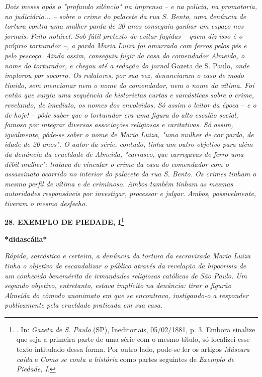\emph{Dois meses após o "profundo silêncio" na imprensa -- e na polícia,
na promotoria, no judiciário... -- sobre o crime do palacete da rua S.
Bento, uma denúncia de tortura contra uma mulher parda de 20 anos
conseguiu ganhar um espaço nos jornais. Feito notável. Sob fútil
pretexto de evitar fugidas -- quem diz isso é o próprio torturador --, a
parda Maria Luiza foi amarrada com ferros pelos pés e pelo pescoço.
Ainda assim, conseguiu fugir da casa do comendador Almeida, o nome do
torturador, e chegou até a redação do jornal} Gazeta de S. Paulo\emph{,
onde implorou por socorro. Os redatores, por sua vez, denunciaram o caso
de modo tímido, sem mencionar nem o nome do comendador, nem o nome da
vítima. Foi então que surgiu uma sequência de historietas curtas e
sarcásticas sobre o crime, revelando, de imediato, os nomes dos
envolvidos. Só assim o leitor da época -- e o de hoje! -- pôde saber que
o torturador era uma figura do alto escalão social, famoso por integrar
diversas associações religiosas e caritativas. Só assim, igualmente,
pôde-se saber o nome de Maria Luiza, "uma mulher de cor parda, de idade
de 20 anos". O autor da série, contudo, tinha um outro objetivo para
além da denúncia da crueldade de Almeida, "carrasco, que carregavas de
ferro uma débil mulher": tratava de vincular o crime da casa do
comendador com o assassinato ocorrido no interior do palacete da rua S.
Bento. Os crimes tinham o mesmo perfil de vítima e de criminoso. Ambos
também tinham as mesmas autoridades responsáveis por investigar,
processar e julgar. Ambos, possivelmente, tiveram o mesmo desfecho. }

\textbf{28. EXEMPLO DE PIEDADE, I}\footnote{. In: \emph{Gazeta de S.
  Paulo} (SP), Ineditoriais, 05/02/1881, p. 3. Embora sinalize que seja
  a primeira parte de uma série com o mesmo título, só localizei esse
  texto intitulado dessa forma. Por outro lado, pode-se ler os artigos
  \emph{Máscara caída} e \emph{Como se conta a história} como partes
  seguintes de \emph{Exemplo de Piedade, I}.}

\textbf{*didascália*}

\emph{Rápida, sarcástica e certeira, a denúncia da tortura da
escravizada Maria Luiza tinha o objetivo de escandalizar o público
através da revelação da hipocrisia de um conhecido benemérito de
irmandades religiosas católicas de São Paulo. Um segundo objetivo,
entretanto, estava implícito na denúncia: tirar o figurão Almeida do
cômodo anonimato em que se encontrava, instigando-o a responder
publicamente pela crueldade praticada em sua casa.}

